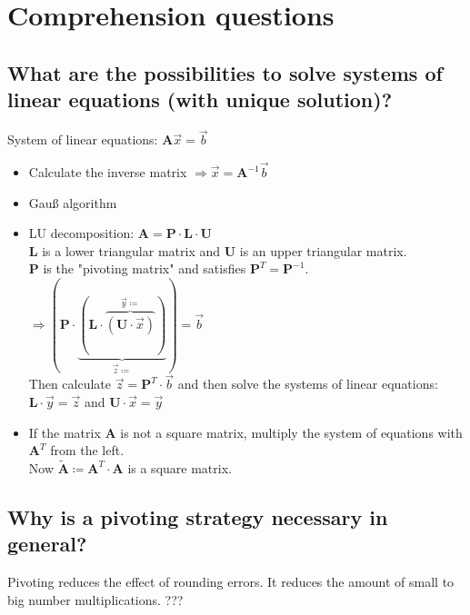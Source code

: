 \setcounter{section}{-1}
\section{Comprehension questions}

\subsection{What are the possibilities to solve systems of linear equations (with unique solution)?}

System of linear equations: $\symbf{A} \overrightarrow{x}=\overrightarrow{b}$

\begin{itemize}
    \item Calculate the inverse matrix $\Rightarrow \overrightarrow{x} = \symbf{A}^{-1} \overrightarrow{b}$
    \item Gauß algorithm
    \item LU decomposition: $\symbf{A} = \symbf{P} \cdot \symbf{L} \cdot \symbf{U}$ \\
        $\symbf{L}$ is a lower triangular matrix and $\symbf{U}$ is an upper triangular matrix. \\
        $\symbf{P}$ is the "pivoting matrix" and satisfies $\symbf{P}^T=\symbf{P}^{-1}$. \\
        $\Rightarrow ( \symbf{P} \cdot \underbrace{ ( \symbf{L} \cdot \overbrace{ ( \symbf{U} \cdot \overrightarrow{x} ) }^{\overrightarrow{y}\coloneqq} ) }_{\overrightarrow{z} \coloneqq} ) = \overrightarrow{b}$ \\
        Then calculate $\overrightarrow{z} = \symbf{P}^T \cdot \overrightarrow{b}$ 
        and then solve the systems of linear equations:  \\
        $\symbf{L}\cdot\overrightarrow{y}=\overrightarrow{z}$ and $\symbf{U}\cdot\overrightarrow{x} = \overrightarrow{y}$
    \item If the matrix $\symbf{A}$ is not a square matrix, multiply the system of equations with $\symbf{A}^T$ from the left. \\
        Now $\tilde{\symbf{A}} \coloneqq \symbf{A}^T \cdot \symbf{A}$ is a square matrix.
  \end{itemize}

\subsection{Why is a pivoting strategy necessary in general?}

Pivoting reduces the effect of rounding errors. It reduces the amount of small to big number multiplications. ???
